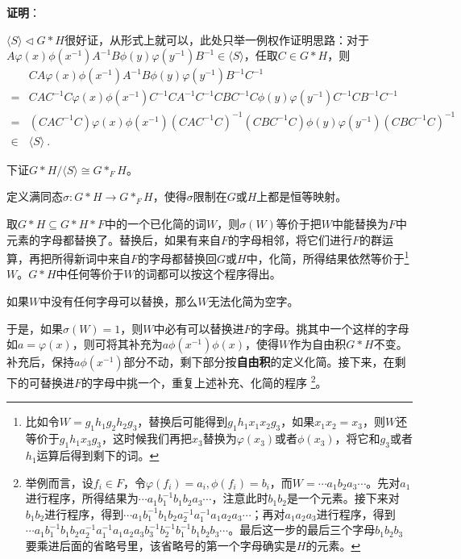 \textbf{证明}：

$\langle S \rangle \lhd G*H$很好证，从形式上就可以，此处只举一例权作证明思路：对于$A\varphi(x)\phi(x^{-1})A^{-1}B\phi(y)\varphi(y^{-1})B^{-1}\in \langle S \rangle$，任取$C\in G*H$，则
\begin{equation}
\begin{aligned}
    &CA\varphi(x)\phi(x^{-1})A^{-1}B\phi(y)\varphi(y^{-1})B^{-1}C^{-1} \\
    ={}& 
    CAC^{-1}C\varphi(x)\phi(x^{-1})C^{-1}CA^{-1}C^{-1}CBC^{-1}C\phi(y)\varphi(y^{-1})C^{-1}CB^{-1}C^{-1}\\
    ={}& 
    (CAC^{-1}C)\varphi(x)\phi(x^{-1})(CAC^{-1}C)^{-1}(CBC^{-1}C)\phi(y)\varphi(y^{-1})(CBC^{-1}C)^{-1}\\
    \in{}& \langle S \rangle~.
\end{aligned}
\end{equation}

下证$G*H/\langle S \rangle \cong G*_F H$。

定义满同态$\sigma:G*H\to G*_FH$，使得$\sigma$限制在$G$或$H$上都是恒等映射。

取$G*H\subseteq G*H*F$中的一个已化简的词$W$，则$\sigma(W)$等价于把$W$中能替换为$F$中元素的字母都替换了。替换后，如果有来自$F$的字母相邻，将它们进行$F$的群运算，再把所得新词中来自$F$的字母都替换回$G$或$H$中，化简，所得结果依然等价于\footnote{比如令$W=g_1h_1g_2h_2g_3$，替换后可能得到$g_1h_1x_1x_2g_3$，如果$x_1x_2=x_3$，则$W$还等价于$g_1h_1x_3g_3$，这时候我们再把$x_3$替换为$\varphi(x_3)$或者$\phi(x_3)$，将它和$g_3$或者$h_1$运算后得到剩下的词。}
$W$。$G*H$中任何等价于$W$的词都可以按这个程序得出。

如果$W$中没有任何字母可以替换，那么$W$无法化简为空字。

于是，如果$\sigma(W)=1$，则$W$中必有可以替换进$F$的字母。挑其中一个这样的字母如$a=\varphi(x)$，则可将其补充为$a\phi(x^{-1})\phi(x)$，使得$W$作为自由积$G*H$不变。补充后，保持$a\phi(x^{-1})$部分不动，剩下部分按\textbf{自由积}的定义化简。接下来，在剩下的可替换进$F$的字母中挑一个，重复上述补充、化简的程序
\footnote{举例而言，设$f_i\in F$，令$\varphi(f_i)=a_i, \phi(f_i)=b_i$，而$W=\cdots a_1b_2a_3 \cdots$。先对$a_1$进行程序，所得结果为$\cdots a_1b_1^{-1}b_1b_2a_3 \cdots $，注意此时$b_1b_2$是一个元素。接下来对$b_1b_2$进行程序，得到$\cdots a_1b_1^{-1}b_1b_2a_2^{-1}a_1^{-1}a_1a_2a_3 \cdots $；再对$a_1a_2a_3$进行程序，得到$\cdots a_1b_1^{-1}b_1b_2a_2^{-1}a_1^{-1}a_1a_2a_3b_3^{-1}b_2^{-1}b_1^{-1}b_1b_2b_3 \cdots $。最后这一步的最后三个字母$b_1b_2b_3$要乘进后面的省略号里，该省略号的第一个字母确实是$H$的元素。
}。

